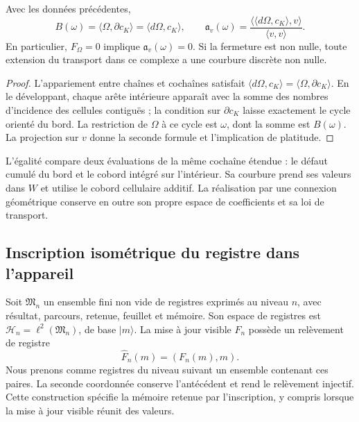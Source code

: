 \begin{theorem}
\label{vii:thm:observador-stokes}
Avec les données précédentes,
\begin{equation}
 B(\omega)=\langle\Omega,\partial c_K\rangle
          =\langle d\Omega,c_K\rangle,
 \qquad
 \mathfrak a_v(\omega)
 =\frac{\langle\langle d\Omega,c_K\rangle,v\rangle}
        {\langle v,v\rangle}.
 \label{vii:eq:observador-stokes}
\end{equation}
En particulier, \(F_\Omega=0\) implique \(\mathfrak a_v(\omega)=0\).
Si la fermeture est non nulle, toute extension du transport dans ce complexe
a une courbure discrète non nulle.
\end{theorem}

\begin{proof}
L'appariement entre chaînes et cochaînes satisfait
\(\langle d\Omega,c_K\rangle=\langle\Omega,\partial c_K\rangle\).
En le développant, chaque arête intérieure apparaît avec la somme des nombres
d'incidence des cellules contiguës ; la condition sur
\(\partial c_K\) laisse exactement le cycle orienté du bord.
La restriction de \(\Omega\) à ce cycle est \(\omega\), dont la somme
est \(B(\omega)\). La projection sur \(v\) donne la seconde formule
et l'implication de platitude.
\end{proof}

L'égalité compare deux évaluations de la même cochaîne étendue : le défaut cumulé du bord et le cobord intégré sur l'intérieur. Sa courbure prend ses valeurs dans \(W\) et utilise le cobord cellulaire additif. La réalisation par une connexion géométrique conserve en outre son propre espace de coefficients et sa loi de transport.

\subsection{Inscription isométrique du registre dans l'appareil}
\label{vii:sec:observador-aparato}

Soit \(\mathfrak M_n\) un ensemble fini non vide de registres exprimés au niveau \(n\), avec résultat, parcours, retenue, feuillet et mémoire. Son espace de registres est \(\mathcal H_n=\ell^2(\mathfrak M_n)\), de base \(|m\rangle\). La mise à jour visible \(F_n\) possède un relèvement de registre
\[
 \widehat F_n(m)=(F_n(m),m).
\]
Nous prenons comme registres du niveau suivant un ensemble contenant ces paires. La seconde coordonnée conserve l'antécédent et rend le relèvement injectif. Cette construction spécifie la mémoire retenue par l'inscription, y compris lorsque la mise à jour visible réunit des valeurs.

